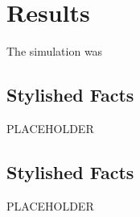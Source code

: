 
\section{Results}

The simulation was 

\subsection{Stylished Facts}
PLACEHOLDER

\subsection{Stylished Facts}
PLACEHOLDER